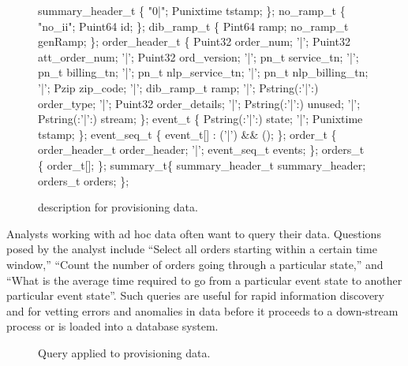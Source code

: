 \begin{figure}
\begin{small}
\begin{code}
  summary\_header\_t \{
  "0|";
  Punixtime tstamp;
\};
\mbox{}
 no\_ramp\_t \{
  "no\_ii";
  Puint64 id;
\};
\mbox{}
 dib\_ramp\_t \{
  Pint64     ramp;
  no\_ramp\_t  genRamp;
\};
\mbox{}
 order\_header\_t \{
       Puint32             order\_num;
 '|';  Puint32             att\_order\_num;
 '|';  Puint32             ord\_version;
 '|';   pn\_t           service\_tn;
 '|';   pn\_t           billing\_tn;
 '|';   pn\_t           nlp\_service\_tn;
 '|';   pn\_t           nlp\_billing\_tn;
 '|';   Pzip           zip\_code;
 '|';  dib\_ramp\_t          ramp;
 '|';  Pstring(:'|':)      order\_type;
 '|';  Puint32             order\_details;
 '|';  Pstring(:'|':)      unused;
 '|';  Pstring(:'|':)      stream;
\};
\mbox{}
 event\_t \{
       Pstring(:'|':)    state;   
  '|'; Punixtime         tstamp;
\};
\mbox{}
 event\_seq\_t \{
  event\_t[] : ('|') && ();
\};
\mbox{}
  order\_t \{
       order\_header\_t  order\_header;
  '|'; event\_seq\_t     events;
\};
\mbox{}
 orders\_t \{
  order\_t[];
\};
\mbox{}
  summary\_t\{
  summary\_header\_t  summary\_header;
  orders\_t          orders;
\};
\end{code}
\end{small}
\caption{\pads{} description for \dibbler{} provisioning data.}
\label{figure:dibbler}
\end{figure}

Analysts working with ad hoc data often want to query their data.  
Questions posed by the \dibbler{} analyst include ``Select all
orders starting within a certain time window,'' ``Count the number of
orders going through a particular state,'' and ``What is the average
time required to go from a particular event state to another
particular event state''.  Such queries are useful for rapid
information discovery and for vetting errors and anomalies in data
before it proceeds to a down-stream process or is loaded into a 
database system. 

\begin{figure}
\begin{small}
\end{small}
\caption{Query applied to \dibbler{} provisioning data.}
\label{figure:dibbler-query}
\end{figure}


